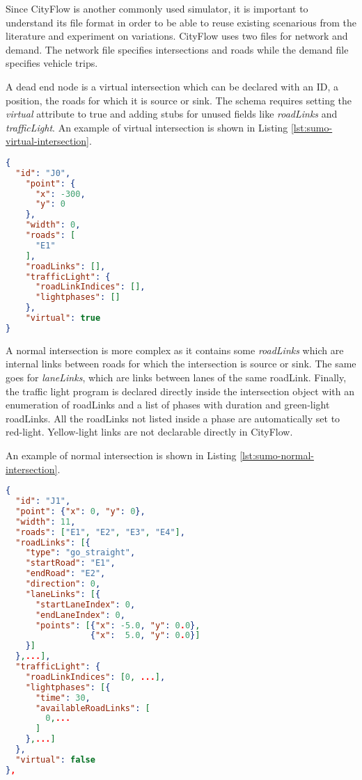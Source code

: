 Since CityFlow is another commonly used simulator, it is important to understand its file format in order to be able to reuse existing scenarious from the literature and experiment on variations.
CityFlow uses two files for network and demand.
The network file specifies intersections and roads while the demand file specifies vehicle trips.

A dead end node is a virtual intersection which can be declared with an ID, a position, the roads for which it is source or sink.
The schema requires setting the \textit{virtual} attribute to true and adding stubs for unused fields like \textit{roadLinks} and \textit{trafficLight}.
An example of virtual intersection is shown in Listing \ref{lst:sumo-virtual-intersection}.

\noindent
\begin{minipage}{\linewidth}
\begin{lstlisting}[language=JSON, caption=Example of virtual intersection declaration in CityFlow format, label={lst:cityflow-virtual-intersection}]
{
  "id": "J0",
    "point": {
      "x": -300,
      "y": 0
    },
    "width": 0,
    "roads": [
      "E1"
    ],
    "roadLinks": [],
    "trafficLight": {
      "roadLinkIndices": [],
      "lightphases": []
    },
    "virtual": true
}
\end{lstlisting}
\end{minipage}

A normal intersection is more complex as it contains some \textit{roadLinks} which are internal links between roads for which the intersection is source or sink.
The same goes for \textit{laneLinks}, which are links between lanes of the same roadLink.
Finally, the traffic light program is declared directly inside the intersection object with an enumeration of roadLinks and a list of phases with duration and green-light roadLinks.
All the roadLinks not listed inside a phase are automatically set to red-light.
Yellow-light links are not declarable directly in CityFlow.

An example of normal intersection is shown in Listing \ref{lst:sumo-normal-intersection}.

\noindent
\begin{minipage}{\linewidth}
\begin{lstlisting}[language=JSON, caption=Example of normal intersection declaration in CityFlow format, label={lst:cityflow-normal-intersection}]
{
  "id": "J1",
  "point": {"x": 0, "y": 0},
  "width": 11,
  "roads": ["E1", "E2", "E3", "E4"],
  "roadLinks": [{
    "type": "go_straight",
    "startRoad": "E1",
    "endRoad": "E2",
    "direction": 0,
    "laneLinks": [{
      "startLaneIndex": 0,
      "endLaneIndex": 0,
      "points": [{"x": -5.0, "y": 0.0},
                 {"x":  5.0, "y": 0.0}]
    }]
  },...],
  "trafficLight": {
    "roadLinkIndices": [0, ...],
    "lightphases": [{
      "time": 30,
      "availableRoadLinks": [
        0,...
      ]
    },...]
  },
  "virtual": false
},
\end{lstlisting}
\end{minipage}

